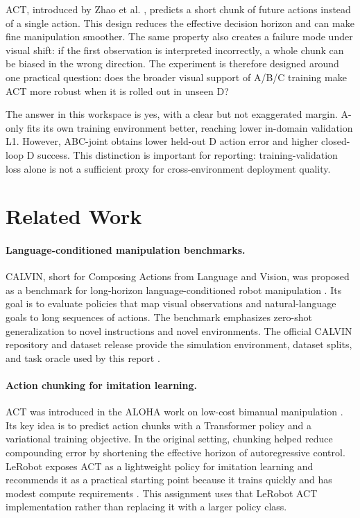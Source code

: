 \documentclass[10pt,twocolumn]{article}
\begin{document}
ACT, introduced by Zhao et al. \cite{zhao2023act}, predicts a short chunk of future actions instead of a single action. This design reduces the effective decision horizon and can make fine manipulation smoother. The same property also creates a failure mode under visual shift: if the first observation is interpreted incorrectly, a whole chunk can be biased in the wrong direction. The experiment is therefore designed around one practical question: does the broader visual support of A/B/C training make ACT more robust when it is rolled out in unseen D?

The answer in this workspace is yes, with a clear but not exaggerated margin. A-only fits its own training environment better, reaching lower in-domain validation L1. However, ABC-joint obtains lower held-out D action error and higher closed-loop D success. This distinction is important for reporting: training-validation loss alone is not a sufficient proxy for cross-environment deployment quality.

\section{Related Work}

\paragraph{Language-conditioned manipulation benchmarks.}
CALVIN, short for Composing Actions from Language and Vision, was proposed as a benchmark for long-horizon language-conditioned robot manipulation \cite{mees2022calvin}. Its goal is to evaluate policies that map visual observations and natural-language goals to long sequences of actions. The benchmark emphasizes zero-shot generalization to novel instructions and novel environments. The official CALVIN repository and dataset release provide the simulation environment, dataset splits, and task oracle used by this report \cite{calvinrepo}.

\paragraph{Action chunking for imitation learning.}
ACT was introduced in the ALOHA work on low-cost bimanual manipulation \cite{zhao2023act}. Its key idea is to predict action chunks with a Transformer policy and a variational training objective. In the original setting, chunking helped reduce compounding error by shortening the effective horizon of autoregressive control. LeRobot exposes ACT as a lightweight policy for imitation learning and recommends it as a practical starting point because it trains quickly and has modest compute requirements \cite{lerobotact}. This assignment uses that LeRobot ACT implementation rather than replacing it with a larger policy class.
\end{document}
